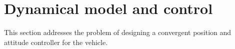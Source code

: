 \documentclass[review]{elsarticle}
\begin{document}







\section{Dynamical model and control}
\label{sec:dynam-model-contr}


This section addresses the problem of designing a convergent position
and attitude controller for the vehicle.
\end{document}

